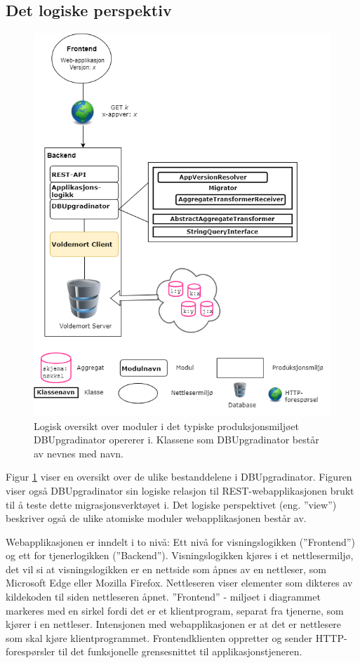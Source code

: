 \subsection{Det logiske perspektiv}
\begin{figure}[hbtp]
    \centering
    \includegraphics[scale=0.6]{fig/dbupgradinator-logisk-1.png}
    \caption{Logisk oversikt over moduler i det typiske produksjonsmiljøet DBUpgradinator opererer i. Klassene som DBUpgradinator består av nevnes med navn.}
    \label{fig5}
\end{figure}

Figur \ref{fig5} viser en oversikt over de ulike bestanddelene i DBUpgradinator. Figuren viser også DBUpgradinator sin logiske relasjon til REST-webapplikasjonen brukt til å teste dette migrasjonsverktøyet i. Det logiske perspektivet (eng. ''view'') beskriver også de ulike atomiske moduler webapplikasjonen består av.

Webapplikasjonen er inndelt i to nivå: Ett nivå for visningslogikken (''Frontend'') og ett for tjenerlogikken (''Backend''). Visningslogikken kjøres i et nettlesermiljø, det vil si at visningslogikken er en nettside som åpnes av en nettleser, som Microsoft Edge eller Mozilla Firefox. Nettleseren viser elementer som dikteres av kildekoden til siden nettleseren åpnet. ''Frontend'' - miljøet i diagrammet markeres med en sirkel fordi det er et klientprogram, separat fra tjenerne, som kjører i en nettleser. Intensjonen med webapplikasjonen er at det er nettlesere som skal kjøre klientprogrammet. Frontendklienten oppretter og sender HTTP-forespørsler til det funksjonelle grensesnittet til applikasjonstjeneren.


